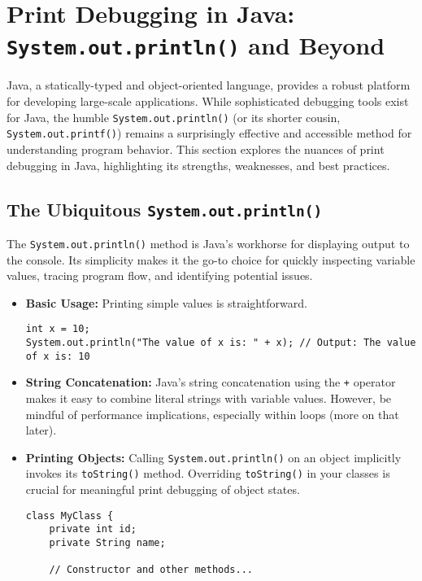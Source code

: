\documentclass{article}
\begin{document}
{{{{\section*{Print Debugging in Java: \texttt{System.out.println()} and Beyond}

Java, a statically-typed and object-oriented language, provides a robust platform for developing large-scale applications. While sophisticated debugging tools exist for Java, the humble \texttt{System.out.println()} (or its shorter cousin, \texttt{System.out.printf()}) remains a surprisingly effective and accessible method for understanding program behavior. This section explores the nuances of print debugging in Java, highlighting its strengths, weaknesses, and best practices.

\subsection*{The Ubiquitous \texttt{System.out.println()}}

The \texttt{System.out.println()} method is Java's workhorse for displaying output to the console. Its simplicity makes it the go-to choice for quickly inspecting variable values, tracing program flow, and identifying potential issues.

\begin{itemize}
\item \textbf{Basic Usage:} Printing simple values is straightforward.
\begin{verbatim}
int x = 10;
System.out.println("The value of x is: " + x); // Output: The value of x is: 10
\end{verbatim}

\item \textbf{String Concatenation:} Java's string concatenation using the \texttt{+} operator makes it easy to combine literal strings with variable values. However, be mindful of performance implications, especially within loops (more on that later).

\item \textbf{Printing Objects:} Calling \texttt{System.out.println()} on an object implicitly invokes its \texttt{toString()} method. Overriding \texttt{toString()} in your classes is crucial for meaningful print debugging of object states.

\begin{verbatim}
class MyClass {
    private int id;
    private String name;

    // Constructor and other methods...


\end{verbatim}
\end{itemize}}}}}
\end{document}
